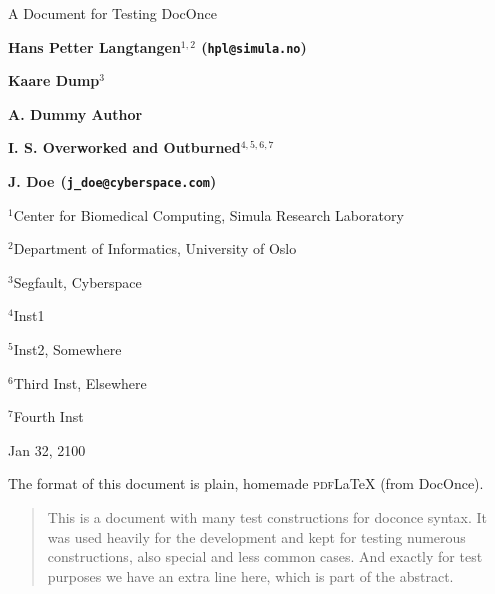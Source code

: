 \documentclass[%
oneside,                 %
final,                   %
10pt]{article}
\theoremstyle{definition}
\begin{document}
\newcommand{\exercisesection}[1]{\subsection*{#1}}


\thispagestyle{empty}
\begin{center}
{\LARGE\bf
\begin{spacing}{1.25}
A Document for Testing DocOnce
\end{spacing}
}
\end{center}
\begin{center}
{\bf Hans Petter Langtangen${}^{1, 2}$ (\texttt{hpl@simula.no})} \\ [0mm]
\end{center}
\begin{center}
{\bf Kaare Dump${}^{3}$} \\ [0mm]
\end{center}
\begin{center}
{\bf A. Dummy Author${}^{}$} \\ [0mm]
\end{center}
\begin{center}
{\bf I. S. Overworked and Outburned${}^{4, 5, 6, 7}$} \\ [0mm]
\end{center}
\begin{center}
{\bf J. Doe${}^{}$ (\texttt{j\_doe@cyberspace.com})} \\ [0mm]
\end{center}
\begin{center}
\centerline{{\small ${}^1$Center for Biomedical Computing, Simula Research Laboratory}}
\centerline{{\small ${}^2$Department of Informatics, University of Oslo}}
\centerline{{\small ${}^3$Segfault, Cyberspace}}
\centerline{{\small ${}^4$Inst1}}
\centerline{{\small ${}^5$Inst2, Somewhere}}
\centerline{{\small ${}^6$Third Inst, Elsewhere}}
\centerline{{\small ${}^7$Fourth Inst}}
\end{center}
    
\begin{center}
Jan 32, 2100
\end{center}
\vspace{1cm}
\tableofcontents
\vspace{1cm} %
The format of this document is
plain, homemade \textsc{pdf}{\LaTeX} (from DocOnce).
\begin{abstract}
This is a document with many test constructions for doconce syntax.
It was used heavily for the development and kept for testing
numerous constructions, also special and less common cases.
And exactly for test purposes we have an extra line here, which
is part of the abstract.
\end{abstract}
\end{document}
